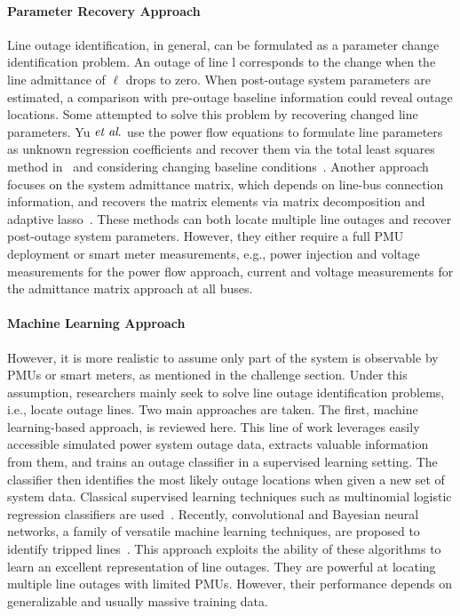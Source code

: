\paragraph{Parameter Recovery Approach}
Line outage identification, in general, can be formulated as a parameter change identification problem. An outage of line l corresponds to the change when the line admittance of $\ell$ drops to zero. When post-outage system parameters are estimated, a comparison with pre-outage baseline information could reveal outage locations. Some attempted to solve this problem by recovering changed line parameters. Yu $\textit{et al}.$ use the power flow equations to formulate line parameters as unknown regression coefficients and recover them via the total least squares method in~\cite{Yu2018} and considering changing baseline conditions~\cite{Yu2019}. Another approach focuses on the system admittance matrix, which depends on line-bus connection information, and recovers the matrix elements via matrix decomposition and adaptive lasso~\cite{Babakmehr2016,Ardakanian2019a}. These methods can both locate multiple line outages and recover post-outage system parameters. However, they either require a full PMU deployment or smart meter measurements, e.g., power injection and voltage measurements for the power flow approach, current and voltage measurements for the admittance matrix approach at all buses.

\paragraph{Machine Learning Approach}
However, it is more realistic to assume only part of the system is observable by PMUs or smart meters, as mentioned in the challenge section. Under this assumption, researchers mainly seek to solve line outage identification problems, i.e., locate outage lines. Two main approaches are taken. The first, machine learning-based approach, is reviewed here. This line of work leverages easily accessible simulated power system outage data, extracts valuable information from them, and trains an outage classifier in a supervised learning setting. The classifier then identifies the most likely outage locations when given a new set of system data. Classical supervised learning techniques such as multinomial logistic regression classifiers are used~\cite{Garcia2016,Kim2018}. Recently, convolutional and Bayesian neural networks, a family of versatile machine learning techniques, are proposed to identify tripped lines~\cite{Li2019a,Zhao2020}. This approach exploits the ability of these algorithms to learn an excellent representation of line outages. They are powerful at locating multiple line outages with limited PMUs. However, their performance depends on generalizable and usually massive training data.

